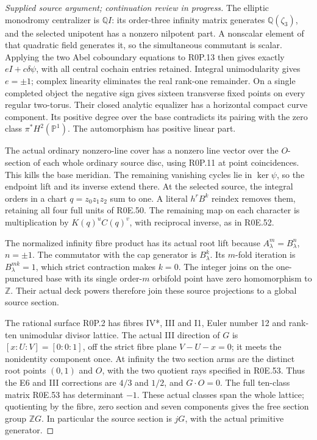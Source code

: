 \begin{proof}[Supplied source argument; continuation review in progress]
\par\nobreak

The elliptic monodromy centralizer is \(\mathbb QI\): its
order-three infinity matrix generates \(\mathbb Q(\zeta_3)\),
and the selected unipotent has a nonzero nilpotent part. A
nonscalar element of that quadratic field generates it, so the
simultaneous commutant is scalar. Applying the two Abel
coboundary equations to R0P.13 then gives exactly
\(eI+c\delta\psi\), with all central cochain entries retained.
Integral unimodularity gives \(e=\pm1\); complex linearity
eliminates the real rank-one remainder. On a single completed
object the negative sign gives sixteen transverse fixed points
on every regular two-torus. Their closed analytic equalizer has
a horizontal compact curve component. Its positive degree over
the base contradicts its pairing with the zero class
\(\pi^*H^2(\mathbb P^1)\). The automorphism has positive
linear part.

The actual ordinary nonzero-line cover has a nonzero line vector
over the \(O\)-section of each whole ordinary source disc, using
R0P.11 at point coincidences. This kills the base meridian.
The remaining vanishing cycles lie in \(\ker\psi\), so the
endpoint lift and its inverse extend there. At the selected
source, the integral orders in a chart \(q=z_0z_1z_2\) sum to
one. A literal \(h^rB^k\) reindex removes them, retaining all
four full units of R0E.50. The remaining map on each character
is multiplication by \(K(q)^uC(q)^v\), with reciprocal inverse,
as in R0E.52.

The normalized infinity fibre product has its actual root lift
because \(A_\lambda^m=B_\lambda^n\), \(n=\pm1\). The
commutator with the cap generator is \(B_\lambda^k\).
Its \(m\)-fold iteration is \(B_\lambda^{mk}=1\), which
strict contraction makes \(k=0\). The integer joins on the
one-punctured base with its single order-\(m\) orbifold point
have zero homomorphism to \(\mathbb Z\). Their actual deck
powers therefore join these source projections to a global
source section.

The rational surface R0P.2 has fibres IV*, III and I1, Euler
number 12 and rank-ten unimodular divisor lattice. The actual
III direction of \(G\) is \([x:U:V]=[0:0:1]\), off the
strict fibre plane \(V-U-x=0\); it meets the nonidentity
component once. At infinity the two section arms are the
distinct root points \((0,1)\) and \(O\), with the two
quotient rays specified in R0E.53. Thus the E6 and III
corrections are \(4/3\) and \(1/2\), and \(G\cdot O=0\).
The full ten-class matrix R0E.53 has determinant \(-1\).
These actual classes span the whole lattice; quotienting by
the fibre, zero section and seven components gives the free
section group \(\mathbb ZG\). In particular the source
section is \(jG\), with the actual primitive generator.


\end{proof}
